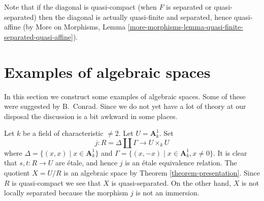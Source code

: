 \noindent
Note that if the diagonal is quasi-compact (when $F$ is separated or
quasi-separated) then the diagonal is actually
quasi-finite and separated, hence quasi-affine (by More on Morphisms,
Lemma \ref{more-morphisms-lemma-quasi-finite-separated-quasi-affine}).








\section{Examples of algebraic spaces}
\label{section-examples}

\noindent
In this section we construct some examples of algebraic spaces.
Some of these were suggested by B.\ Conrad.
Since we do not yet have a lot of theory at our disposal the
discussion is a bit awkward in some places.

\begin{example}
\label{example-affine-line-involution}
Let $k$ be a field of characteristic $\not = 2$. Let $U = \mathbf{A}^1_k$. Set
$$
j : R = \Delta \coprod \Gamma \longrightarrow U \times_k U
$$
where $\Delta = \{(x, x) \mid x \in \mathbf{A}^1_k\}$ and
$\Gamma = \{(x, -x) \mid x \in \mathbf{A}^1_k, x \not = 0\}$.
It is clear that $s, t : R \to U$ are \'etale, and hence
$j$ is an \'etale equivalence relation.
The quotient $X = U/R$ is an algebraic space by
Theorem \ref{theorem-presentation}.
Since $R$ is quasi-compact we see that $X$ is quasi-separated.
On the other hand, $X$ is not locally separated because
the morphism $j$ is not an immersion.
\end{example}

